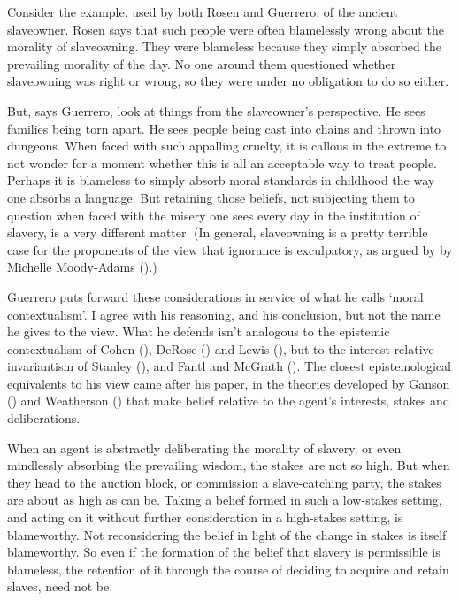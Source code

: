 \documentclass[
  10pt,
  letterpaper,
  twoside]{scrbook}
\begin{document}
Consider the example, used by both Rosen and Guerrero, of the ancient
slaveowner. Rosen says that such people were often blamelessly wrong
about the morality of slaveowning. They were blameless because they
simply absorbed the prevailing morality of the day. No one around them
questioned whether slaveowning was right or wrong, so they were under no
obligation to do so either.

But, says Guerrero, look at things from the slaveowner's perspective. He
sees families being torn apart. He sees people being cast into chains
and thrown into dungeons. When faced with such appalling cruelty, it is
callous in the extreme to not wonder for a moment whether this is all an
acceptable way to treat people. Perhaps it is blameless to simply absorb
moral standards in childhood the way one absorbs a language. But
retaining those beliefs, not subjecting them to question when faced with
the misery one sees every day in the institution of slavery, is a very
different matter. (In general, slaveowning is a pretty terrible case for
the proponents of the view that ignorance is exculpatory, as argued by
by Michelle Moody-Adams ().)

Guerrero puts forward these considerations in service of what he calls
`moral contextualism'. I agree with his reasoning, and his conclusion,
but not the name he gives to the view. What he defends isn't analogous
to the epistemic contextualism of Cohen
(), DeRose
() and Lewis
(), but to the interest-relative
invariantism of Stanley (), and Fantl
and McGrath (). The closest
epistemological equivalents to his view came after his paper, in the
theories developed by Ganson () and
Weatherson () that make belief
relative to the agent's interests, stakes and deliberations.

When an agent is abstractly deliberating the morality of slavery, or
even mindlessly absorbing the prevailing wisdom, the stakes are not so
high. But when they head to the auction block, or commission a
slave-catching party, the stakes are about as high as can be. Taking a
belief formed in such a low-stakes setting, and acting on it without
further consideration in a high-stakes setting, is blameworthy. Not
reconsidering the belief in light of the change in stakes is itself
blameworthy. So even if the formation of the belief that slavery is
permissible is blameless, the retention of it through the course of
deciding to acquire and retain slaves, need not be.
\end{document}
